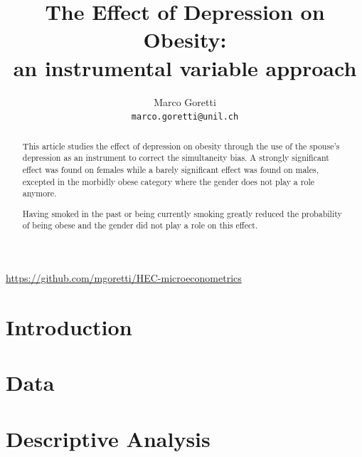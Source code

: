 \documentclass[10pt]{article} %
\title{ The Effect of Depression on Obesity:  \\ an instrumental variable approach }
\author{
Marco Goretti \\
\texttt{marco.goretti@unil.ch}
}
\begin{document}
\maketitle
\thispagestyle{empty}

\vspace{1cm}
\begin{abstract}

This article studies the effect of depression on obesity through the use of the spouse's depression as an instrument to correct the simultaneity bias. A strongly significant effect was found on females while a barely significant effect was found on males, excepted in the morbidly obese category where the gender does not play a role anymore.

Having smoked in the past or being currently smoking greatly reduced the probability of being obese and the gender did not play a role on this effect.
\end{abstract}

\vfill

\begin{center}
\url{https://github.com/mgoretti/HEC-microeconometrics}
\end{center}

\newpage
\setcounter{page}{1}

\section{Introduction}

	
\section{Data}


\section{Descriptive Analysis}

\end{document}
